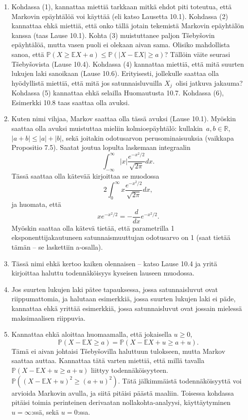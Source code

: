 \documentclass[11pt,a4paper]{amsart}
\newcommand{\R}{\mathbb{R}}
\newcommand{\E}{\mathbb{E}}
\newcommand{\1}{\mathbf{1}}
\renewcommand{\P}{\mathbb P}
\begin{document}
\begin{Solution}
\begin{enumerate}
\item Kohdassa (1), kannattaa miettiä tarkkaan mitkä ehdot piti toteutua, että Markovin epäyhtälöä voi käyttää (eli katso Lausetta 10.1). Kohdassa (2) kannattaa ehkä miettiä, että onko tällä jotain tekemistä Markovin epäyhtälön kanssa (taas Lause 10.1). Kohta (3) muistuttanee paljon T\v{s}eby\v{s}ovin epäyhtälöä, mutta vasen puoli ei olekaan aivan sama. Olisiko mahdollista sanoa, että $\P(X\geq \E X+a)\leq \P(|X-\E X|\geq a)$? Tällöin väite seurasi T\v{s}eby\v{s}ovista (Lause 10.4). Kohdassa (4) kannattaa miettiä, että mitä suurten lukujen laki sanoikaan (Lause 10.6). Erityisesti, jollekulle saattaa olla hyödyllistä miettiä, että mitä jos satunnaisluvuilla $X_j$ olisi jatkuva jakauma? Kohdassa (5) kannattaa ehkä selailla Huomautusta 10.7. Kohdassa (6), Esimerkki 10.8 taas saattaa olla avuksi.
\item Kuten nimi vihjaa, Markov saattaa olla tässä avuksi (Lause 10.1). Myöskin saattaa olla avuksi muistuttaa mieliin kolmioepäyhtälö: kullakin $a,b\in \R$, $|a+b|\leq |a|+|b|$, sekä joitakin odotusarvon perusominaisuuksia (vaikkapa Propositio 7.5). Saatat joutua lopulta laskemaan integraalin 
\[
\int_{-\infty}^\infty |x| \frac{e^{-x^2/2}}{\sqrt{2\pi}}dx.
\]
Tässä saattaa olla kätevää kirjoittaa se muodossa 
\[
2\int_0^\infty x \frac{e^{-x^2/2}}{\sqrt{2\pi}}dx,
\]
ja huomata, että 
\[
x e^{-x^2/2}=-\frac{d}{dx} e^{-x^2/2}.
\]
Myöskin saattaa olla kätevä tietää, että parametrilla 1 eksponenttijakautuneen satunnaismuuttujan odotusarvo on 1 (saat tietää tämän -- se laskettiin a-osalla).
\item Tässä nimi ehkä kertoo kaiken olennaisen -- katso Lause 10.4 ja yritä kirjoittaa haluttu todennäköisyys kyseisen lauseen muodossa.
\item Jos suurten lukujen laki pätee tapauksessa, jossa satunnaisluvut ovat riippumattomia, ja halutaan esimerkkiä, jossa suurten lukujen laki ei päde, kannattaa ehkä yrittää esimerkkiä, jossa satunnaisluvut ovat jossain mielessä maksimaalisen riippuvia.
\item Kannattaa ehkä aloittaa huomaamalla, että jokaisella $u\geq 0$, 
\[
\P(X-\E X\geq a)=\P(X-\E X+u\geq a+u).
\]
Tämä ei aivan johtaisi T\v{s}eby\v{s}ovilla haluttuun tulokseen, mutta Markov saattaa auttaa. Kannattaa tätä varten miettiä, että millä tavalla $\P(X-\E X+u\geq a+u)$ liittyy todennäköisyyteen. $\P((X-\E X+u)^2\geq (a+u)^2)$. Tätä jälkimmäistä todennäköisyyttä voi arvioida Markovin avulla, ja siitä pitäisi päästä maaliin. Toisessa kohdassa pitäisi toimia perinteinen derivaatan nollakohta-analyysi, käyttäytyminen $u=\infty$:ssä, sekä $u=0$:ssa.

\end{enumerate}
\end{Solution}
\end{document}
